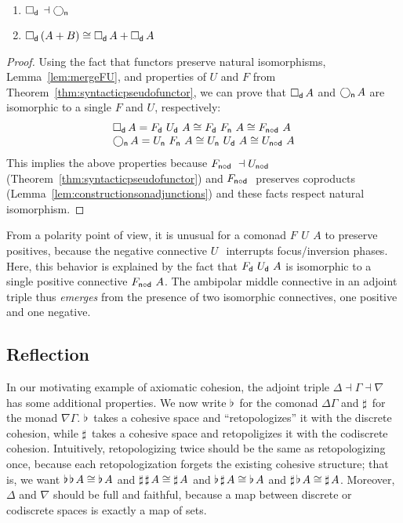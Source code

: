 \documentclass{drl-common/llncs}
\newcommand{\la}{\ensuremath{\dashv}}
\newcommand\compo[2]{\ensuremath{#1 \circ #2}}
\newcommand\F[2]{\ensuremath{F_{#1} \,\, #2}}
\newcommand\U[2]{\ensuremath{U_{#1} \,\, #2}}
\newcommand\coprd[2]{\ensuremath{#1 + #2}}
\newcommand\Bx[2]{\ensuremath{\Box_{#1} \, {#2}}}
\newcommand\Crc[2]{\ensuremath{\bigcirc_{#1} \, {#2}}}
\newcommand\Flat[1]{\ensuremath{\flat \, {#1}}}
\newcommand\Sharp[1]{\ensuremath{\sharp \, {#1}}}
\begin{document}
\begin{theorem} \label{thm:adjointtriple}
\begin{enumerate}
\item $\Bx{\dsd{d}}{} \la \Crc{\dsd{n}}{}$ 
\item $\Bx{\dsd{d}}{(\coprd A B)} \iso \coprd{\Bx{\dsd{d}}{A}}{\Bx{\dsd{d}}{A}}$
\end{enumerate}
\end{theorem}

\begin{proof}
Using the fact that functors preserve natural isomorphisms,
Lemma~\ref{lem:mergeFU}, and properties of $U$ and $F$ from
Theorem~\ref{thm:syntacticpseudofunctor}, we can prove that \Bx{\dsd d}{A}
and \Crc{\dsd n}{A} are isomorphic to a single $F$ and $U$, 
respectively:
\[
\begin{array}{l}
\Bx{\dsd d}{A} = \F{\dsd{d}}{\U{\dsd d}{A}} \cong \F{\dsd d}{\F{\dsd n}{A}} \cong \F{\compo{\dsd{n}}{\dsd{d}}}{A}\\
\Crc{\dsd{n}}{A} = \U{\dsd{n}}{\F{\dsd n}{A}} \cong \U{\dsd n}{\U{\dsd d}{A}} \cong \U{\compo{\dsd{n}}{\dsd d}}{A}
\end{array}
\]
This implies the above properties because 
$\F{\compo{\dsd{n}}{\dsd{d}}}{} \la \U{\compo{\dsd{n}}{\dsd d}}{}$
(Theorem~\ref{thm:syntacticpseudofunctor})
and $\F{\compo{\dsd{n}}{\dsd{d}}}$ preserves coproducts
(Lemma~\ref{lem:constructionsonadjunctions}) 
and these facts respect natural isomorphism.  
\end{proof}

From a polarity point of view, it is unusual for a comonad
$\F{}{\U{}{A}}$ to preserve positives, because the negative connective
$\U{}{}$ interrupts focus/inversion phases.  Here, this behavior is
explained by the fact that $\F{\dsd{d}}{\U{\dsd{d}}{A}}$ is isomorphic
to a single positive connective $\F{\compo{\dsd n}{\dsd d}}{A}$.  The
ambipolar middle connective in an adjoint triple thus \emph{emerges}
from the presence of two isomorphic connectives, one positive and one
negative.

\subsection{Reflection}

In our motivating example of axiomatic cohesion, the adjoint triple
$\Delta \la \Gamma \la \nabla$ has some additional properties.  We now
write $\Flat{}$ for the comonad $\Delta\Gamma$ and $\Sharp{}$ for the
monad $\nabla\Gamma$. $\Flat{}$ takes a cohesive space and
``retopologizes'' it with the discrete cohesion, while $\Sharp{}$ takes
a cohesive space and retopoligizes it with the codiscrete cohesion.
Intuitively, retopologizing twice should be the same as retopologizing
once, because each retopologization forgets the existing cohesive
structure; that is, we want $\Flat{\Flat{A}} \iso \Flat A$ and
$\Sharp{\Sharp{A}} \iso \Sharp A$ and $\Flat{\Sharp{A}} \iso \Flat A$ and
$\Sharp{\Flat{A}} \iso \Sharp A$.  Moreover, $\Delta$ and $\nabla$ should
be full and faithful, because a map between discrete or codiscrete
spaces is exactly a map of sets.
\end{document}
